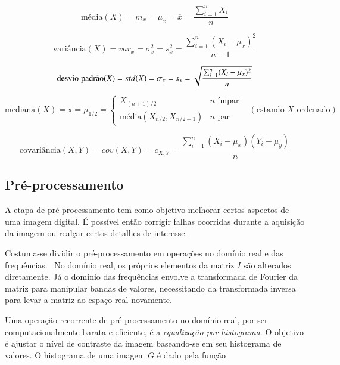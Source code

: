 \begin{equation}
\text{média}(X) = m_x=\mu_x=\overline{x}=\frac{\sum_{i=1}^{n}X_i}{n}
\end{equation}

\begin{equation}
\text{variância}(X)=var_x=\sigma^2_x=s^2_x=\frac{\sum_{i=1}^{n}(X_i-\mu_x)^2}{n-1}
\end{equation}

\begin{equation}
\text{desvio\;padrão}(X)=std(X)=\sigma_x=s_x=\sqrt{\frac{\sum_{i=1}^{n}(X_i-\mu_x)^2}{n}}
\end{equation}

\begin{equation}
\text{mediana}(X) = \text{\~{x}} =\mu_{1/2}= \begin{cases}
                               X_{(n+1)/2} & n \,\, \text{ímpar} \\
                               \text{média}(X_{n/2}, X_{n/2+1}) & n \,\, \text{par}
                               \end{cases} \,\,\,\,\, (\text{estando $X$ ordenado})
\end{equation}


\begin{equation}
\text{covariância}(X,Y)=cov(X,Y)=c_{X,Y}=\frac{\sum_{i=1}^{n}(X_i-\mu_x)(Y_i-\mu_y) }{n}
\end{equation}

\subsection{Pré-processamento}
\label{sec:preproc}

A etapa de pré-processamento tem como objetivo melhorar certos aspectos de uma
imagem digital. É possível então corrigir falhas ocorridas durante a aquisição
da imagem ou realçar certos detalhes de interesse.

Costuma-se dividir o pré-processamento em operações no domínio real e das
frequências.~\cite{gonzalez} No domínio real, os próprios elementos da matriz $I$ são alterados
diretamente. Já o domínio das frequências envolve a transformada de Fourier da
matriz para manipular bandas de valores, necessitando da transformada inversa
para levar a matriz ao espaço real novamente. 

Uma operação recorrente de pré-processamento no domínio real, por ser
computacionalmente barata e eficiente, é a \emph{equalização por histograma}. O
objetivo é ajustar o nível de contraste da imagem baseando-se em seu histograma
de valores. O histograma de uma imagem $G$ é dado pela função

